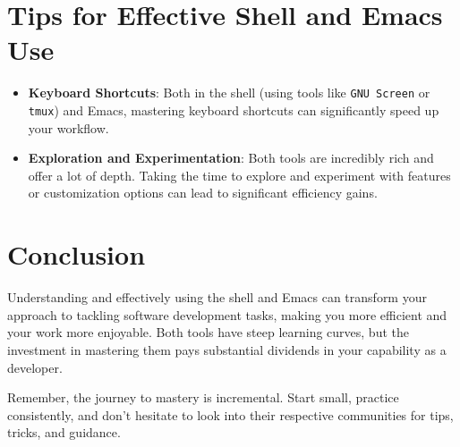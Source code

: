 \documentclass{article}
\begin{document}
\section{Tips for Effective Shell and Emacs Use}

\begin{itemize}
    \item \textbf{Keyboard Shortcuts}: Both in the shell (using tools like \texttt{GNU Screen} or \texttt{tmux}) and Emacs, mastering keyboard shortcuts can significantly speed up your workflow.
    \item \textbf{Exploration and Experimentation}: Both tools are incredibly rich and offer a lot of depth. Taking the time to explore and experiment with features or customization options can lead to significant efficiency gains.
\end{itemize}

\section{Conclusion}

Understanding and effectively using the shell and Emacs can transform your approach to tackling software development tasks, making you more efficient and your work more enjoyable. Both tools have steep learning curves, but the investment in mastering them pays substantial dividends in your capability as a developer.

Remember, the journey to mastery is incremental. Start small, practice consistently, and don't hesitate to look into their respective communities for tips, tricks, and guidance.
\end{document}
